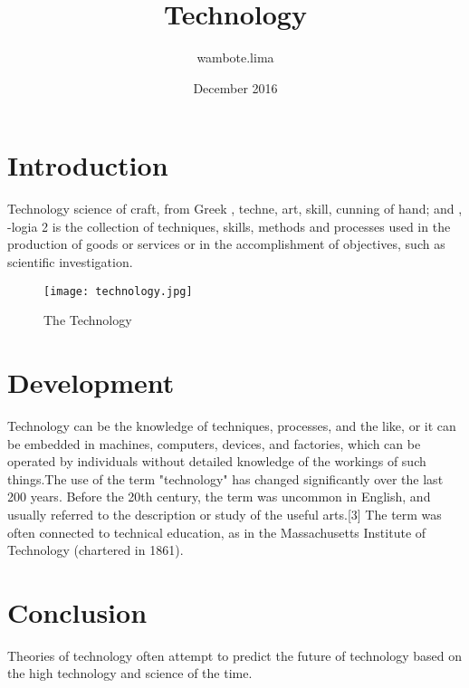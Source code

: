 \documentclass{article}
\title{Technology}
\author{wambote.lima }
\date{December 2016}
\begin{document}
\maketitle

\section{Introduction}
Technology science of craft, from Greek , techne, art, skill, cunning of hand; and , -logia 2 is the collection of techniques, skills, methods and processes used in the production of goods or services or in the accomplishment of objectives, such as scientific investigation. 

\begin{figure}[!htb]
    \centering
    \texttt{[image: technology.jpg]}
    \caption{The Technology}
    \label{fig:technology}
\end{figure}

\section{Development}
Technology can be the knowledge of techniques, processes, and the like, or it can be embedded in machines, computers, devices, and factories, which can be operated by individuals without detailed knowledge of the workings of such things.The use of the term "technology" has changed significantly over the last 200 years. Before the 20th century, the term was uncommon in English, and usually referred to the description or study of the useful arts.[3] The term was often connected to technical education, as in the Massachusetts Institute of Technology (chartered in 1861).

\section{Conclusion}
Theories of technology often attempt to predict the future of technology based on the high technology and science of the time. 



\end{document}
